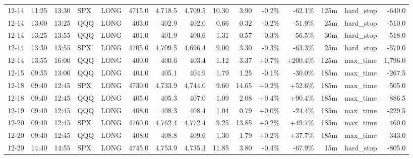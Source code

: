 \documentclass[11pt,a4paper,twoside]{article}
\begin{document}
\begin{landscape}
\begin{center}
\begin{longtable}{>{\color{txtmain}}l l l l l r r r r r r r r >{\color{txtmain}}l r}
12-14 & 11:25 & 13:30 & SPX & LONG & 4715.0 & 4,718.5 & 4,709.5 & 10.30 & 3.90 & \textcolor{lossred}{-0.2\%} & \textcolor{lossred}{-62.1\%} & 125m & hard\_stop & \textcolor{lossred}{-640.0} \\
12-14 & 13:00 & 13:25 & QQQ & LONG & 403.0 & 402.9 & 402.0 & 0.66 & 0.32 & \textcolor{lossred}{-0.2\%} & \textcolor{lossred}{-51.9\%} & 25m & hard\_stop & \textcolor{lossred}{-510.0} \\
12-14 & 13:25 & 13:55 & QQQ & LONG & 401.0 & 401.9 & 400.6 & 1.31 & 0.57 & \textcolor{lossred}{-0.3\%} & \textcolor{lossred}{-56.5\%} & 30m & hard\_stop & \textcolor{lossred}{-518.0} \\
12-14 & 13:30 & 13:55 & SPX & LONG & 4705.0 & 4,709.5 & 4,696.4 & 9.00 & 3.30 & \textcolor{lossred}{-0.3\%} & \textcolor{lossred}{-63.3\%} & 25m & hard\_stop & \textcolor{lossred}{-570.0} \\
12-14 & 13:55 & 16:00 & QQQ & LONG & 400.0 & 400.6 & 403.4 & 1.12 & 3.37 & \textcolor{wingreen}{+0.7\%} & \textcolor{wingreen}{+200.4\%} & 125m & max\_time & \textcolor{wingreen}{1,796.0} \\
12-15 & 09:55 & 13:00 & QQQ & LONG & 404.0 & 405.1 & 404.9 & 1.79 & 1.25 & \textcolor{lossred}{-0.1\%} & \textcolor{lossred}{-30.0\%} & 185m & max\_time & \textcolor{lossred}{-267.5} \\
12-18 & 09:40 & 12:45 & SPX & LONG & 4730.0 & 4,733.9 & 4,744.0 & 9.60 & 14.65 & \textcolor{wingreen}{+0.2\%} & \textcolor{wingreen}{+52.6\%} & 185m & max\_time & \textcolor{wingreen}{505.0} \\
12-18 & 09:40 & 12:45 & QQQ & LONG & 405.0 & 405.3 & 407.0 & 1.09 & 2.08 & \textcolor{wingreen}{+0.4\%} & \textcolor{wingreen}{+90.4\%} & 185m & max\_time & \textcolor{wingreen}{886.5} \\
12-19 & 09:40 & 12:45 & QQQ & LONG & 408.0 & 408.3 & 408.4 & 1.04 & 0.79 & \textcolor{wingreen}{+0.0\%} & \textcolor{lossred}{-24.4\%} & 185m & max\_time & \textcolor{lossred}{-229.5} \\
12-20 & 09:40 & 12:45 & SPX & LONG & 4760.0 & 4,762.4 & 4,772.4 & 9.25 & 13.85 & \textcolor{wingreen}{+0.2\%} & \textcolor{wingreen}{+49.7\%} & 185m & max\_time & \textcolor{wingreen}{460.0} \\
12-20 & 09:40 & 12:45 & QQQ & LONG & 408.0 & 408.8 & 409.6 & 1.30 & 1.79 & \textcolor{wingreen}{+0.2\%} & \textcolor{wingreen}{+37.7\%} & 185m & max\_time & \textcolor{wingreen}{343.0} \\
12-20 & 14:40 & 14:55 & SPX & LONG & 4745.0 & 4,753.9 & 4,735.3 & 11.85 & 3.80 & \textcolor{lossred}{-0.4\%} & \textcolor{lossred}{-67.9\%} & 15m & hard\_stop & \textcolor{lossred}{-805.0} \\

\end{longtable}
\end{center}
\end{landscape}
\end{document}
